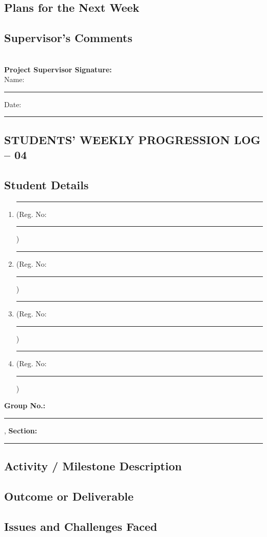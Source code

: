 \documentclass[a4paper]{article}
\begin{document}
\subsection*{Plans for the Next Week}
\framebox[\textwidth][c]{\rule{0pt}{4cm}}

\subsection*{Supervisor's Comments}
\framebox[\textwidth][c]{\rule{0pt}{4cm}}\\[2em]

\vfill
\textbf{Project Supervisor Signature:}\\[1em]
Name: \rule{6cm}{0.4pt} \hfill Date: \rule{4cm}{0.4pt}
\newpage
\begin{center}
\section*{STUDENTS' WEEKLY PROGRESSION LOG -- 04}
\end{center}
\subsection*{Student Details}
\begin{enumerate}[itemsep=0em]
\item \rule{8cm}{0.4pt} (Reg. No:\rule{2cm}{0.4pt})
\item \rule{8cm}{0.4pt} (Reg. No:\rule{2cm}{0.4pt})
\item \rule{8cm}{0.4pt} (Reg. No:\rule{2cm}{0.4pt})
\item \rule{8cm}{0.4pt} (Reg. No:\rule{2cm}{0.4pt})
\end{enumerate}
\textbf{Group No.:} \rule{4cm}{0.4pt}, \textbf{Section:} \rule{3.5cm}{0.4pt}

				 
\subsection*{Activity / Milestone Description}
\framebox[\textwidth][c]{\rule{0pt}{4cm}}

\subsection*{Outcome or Deliverable}
\framebox[\textwidth][c]{\rule{0pt}{4cm}}


\subsection*{Issues and Challenges Faced}
\framebox[\textwidth][c]{\rule{0pt}{4cm}}
\end{document}

